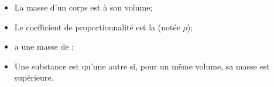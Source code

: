 \begin{mybilan}
	\begin{itemize}
		\item La masse d'un corps est  à son volume; \pause
		\item Le coefficient de proportionnalité est la  (notée $\rho$);\pause
		\item {} a une masse de ;\pause
		\item Une substance est  qu'une autre si, pour un même volume, sa masse est supérieure.		
	\end{itemize}
\end{mybilan}